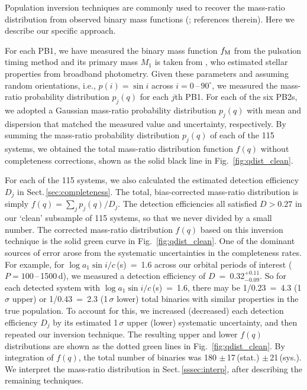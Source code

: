 \documentclass[a4paper,fleqn,usenatbib]{mnras}
\begin{document}
Population inversion techniques are commonly used to recover the mass-ratio distribution from observed binary mass functions (\citealt{mazeh&goldberg1992}; references therein). Here we describe our specific approach.

For each PB1, we have measured the binary mass function $f_{\rm M}$ from the pulsation timing method and its primary mass $M_1$ is taken from \citet{huberetal2014}, who estimated stellar properties from broadband photometry.  Given these parameters and assuming random orientations, i.e., $p(i) = \sin i$ across $i = 0$\,--\,$90^{\circ}$, we measured the mass-ratio probability distribution $p_j(q)$ for each $j$th PB1. For each of the six PB2s, we adopted a Gaussian mass-ratio probability distribution $p_j(q)$ with mean and dispersion that matched the measured value and uncertainty, respectively. By summing the mass-ratio probability distribution $p_j(q)$ of each of the 115 systems, we obtained the total mass-ratio distribution function $f(q)$ without completeness corrections, shown as the solid black line in Fig.~\ref{fig:qdist_clean}.

For each of the 115 systems, we also calculated the estimated detection efficiency $D_j$ in Sect.\,\ref{sec:completeness}. The total, bias-corrected mass-ratio distribution is simply $f(q)=\sum_j p_j(q)/D_j$. The detection efficiencies all satisfied $D>0.27$ in our `clean' subsample of 115 systems, so that we never divided by a small number.  The corrected mass-ratio distribution $f(q)$ based on this inversion technique is the solid green curve in Fig.~\ref{fig:qdist_clean}.  One of the dominant sources of error arose from the systematic uncertainties in the completeness rates.  For example, for $\log a_1 \sin i/c$\,(s)~=~1.6 across our orbital periods of interest ($P = 100$\,--\,1500\,d), we  measured a detection efficiency of $D$~=~0.32$_{-0.09}^{+0.11}$.  So for each detected system with $\log a_1 \sin i/c$\,(s)~=~1.6, there may be 1/0.23~=~4.3 (1\,$\sigma$ upper) or 1/0.43~=~2.3 (1\,$\sigma$ lower) total binaries with similar properties in the true population.  To account for this, we increased (decreased) each detection efficiency $D_j$ by its estimated 1\,$\sigma$ upper (lower) systematic uncertainty, and then repeated our inversion technique. The resulting upper and lower $f(q)$ distributions are shown as the dotted green lines in Fig.~\ref{fig:qdist_clean}.  By integration of $f(q)$, the total number of binaries was 180 $\pm$\,17\,(stat.) $\pm$\,21\,(sys.). We interpret the mass-ratio distribution in Sect.\,\ref{sssec:interp}, after describing the remaining techniques.
\end{document}
